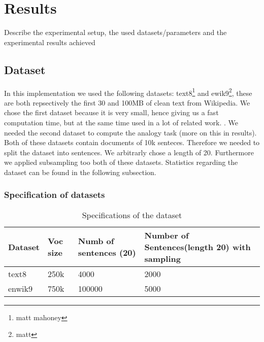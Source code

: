 \chapter{Results}\label{chap:results}


Describe the experimental setup, the used datasets/parameters and the experimental results achieved

\section{Dataset}
In this implementation we used the following datasets: text8\footnote{matt mahoney} and ewik9\footnote{matt}, these are both repsectively the first 30 and 100MB of clean text from Wikipedia. We chose the first dataset because it is very small, hence giving us a fast computation time, but at the same time used in a lot of related work. \cite{intel} \cite{gpu}. We needed the second dataset to compute the analogy task (more on this in results). 
Both of these datasets contain documents of 10k senteces. Therefore we needed to split the dataset into sentences. We arbitrarly chose a length of 20. Furthermore we applied subsampling too both of these datasets. Statistics regarding the dataset can be found in the following subsection. 

\subsection{Specification of datasets}
\begin{table}[]
\begin{tabular}{|l|l|l|l|}
\hline
Dataset & Voc size & Numb of sentences (20) & Number of Sentences(length 20) with sampling \\ \hline
text8   & 250k     & 4000                   & 2000                                         \\ \hline
enwik9  & 750k     & 100000                 & 5000                                         \\ \hline
\end{tabular}
\caption{Specifications of the dataset}
\end{table}

